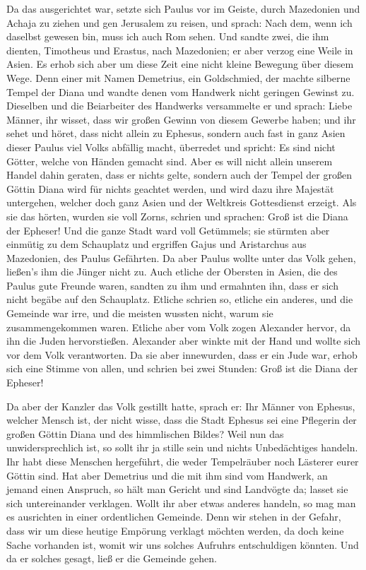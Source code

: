  Da das ausgerichtet war, setzte sich Paulus vor im
Geiste, durch Mazedonien und Achaja zu ziehen und gen Jerusalem zu
reisen, und sprach: Nach dem, wenn ich daselbst gewesen bin, muss ich
auch Rom sehen.  Und sandte zwei, die ihm dienten,
Timotheus und Erastus, nach Mazedonien; er aber verzog eine Weile in
Asien.  Es erhob sich aber um diese Zeit eine nicht
kleine Bewegung über diesem Wege.  Denn einer mit Namen
Demetrius, ein Goldschmied, der machte silberne Tempel der Diana und
wandte denen vom Handwerk nicht geringen Gewinst zu. 
Dieselben und die Beiarbeiter des Handwerks versammelte er und sprach:
Liebe Männer, ihr wisset, dass wir großen Gewinn von diesem Gewerbe
haben;  und ihr sehet und höret, dass nicht allein zu
Ephesus, sondern auch fast in ganz Asien dieser Paulus viel Volks
abfällig macht, überredet und spricht: Es sind nicht Götter, welche von
Händen gemacht sind.  Aber es will nicht allein unserem
Handel dahin geraten, dass er nichts gelte, sondern auch der Tempel der
großen Göttin Diana wird für nichts geachtet werden, und wird dazu ihre
Majestät untergehen, welcher doch ganz Asien und der Weltkreis
Gottesdienst erzeigt.  Als sie das hörten, wurden sie
voll Zorns, schrien und sprachen: Groß ist die Diana der Epheser!
 Und die ganze Stadt ward voll Getümmels; sie stürmten
aber einmütig zu dem Schauplatz und ergriffen Gajus und Aristarchus aus
Mazedonien, des Paulus Gefährten.  Da aber Paulus wollte
unter das Volk gehen, ließen's ihm die Jünger nicht zu. 
Auch etliche der Obersten in Asien, die des Paulus gute Freunde waren,
sandten zu ihm und ermahnten ihn, dass er sich nicht begäbe auf den
Schauplatz.  Etliche schrien so, etliche ein anderes, und
die Gemeinde war irre, und die meisten wussten nicht, warum sie
zusammengekommen waren.  Etliche aber vom Volk zogen
Alexander hervor, da ihn die Juden hervorstießen. Alexander aber winkte
mit der Hand und wollte sich vor dem Volk verantworten. 
Da sie aber innewurden, dass er ein Jude war, erhob sich eine Stimme von
allen, und schrien bei zwei Stunden: Groß ist die Diana der Epheser!

 Da aber der Kanzler das Volk gestillt hatte, sprach er:
Ihr Männer von Ephesus, welcher Mensch ist, der nicht wisse, dass die
Stadt Ephesus sei eine Pflegerin der großen Göttin Diana und des
himmlischen Bildes?  Weil nun das unwidersprechlich ist,
so sollt ihr ja stille sein und nichts Unbedächtiges handeln.
 Ihr habt diese Menschen hergeführt, die weder
Tempelräuber noch Lästerer eurer Göttin sind.  Hat aber
Demetrius und die mit ihm sind vom Handwerk, an jemand einen Anspruch,
so hält man Gericht und sind Landvögte da; lasset sie sich untereinander
verklagen.  Wollt ihr aber etwas anderes handeln, so mag
man es ausrichten in einer ordentlichen Gemeinde.  Denn
wir stehen in der Gefahr, dass wir um diese heutige Empörung verklagt
möchten werden, da doch keine Sache vorhanden ist, womit wir uns solches
Aufruhrs entschuldigen könnten. Und da er solches gesagt, ließ er die
Gemeinde gehen.

